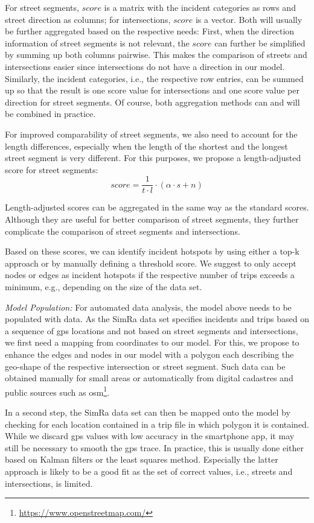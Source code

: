 For street segments, $score$ is a matrix with the incident categories as rows and street direction as columns; for intersections, $score$ is a vector.
Both will usually be further aggregated based on the respective needs:
First, when the direction information of street segments is not relevant, the $score$ can further be simplified by summing up both columns pairwise.
This makes the comparison of streets and intersections easier since intersections do not have a direction in our model.
Similarly, the incident categories, i.e., the respective row entries, can be summed up so that the result is one score value for intersections and one score value per direction for street segments.
Of course, both aggregation methods can and will be combined in practice.

For improved comparability of street segments, we also need to account for the length differences, especially when the length of the shortest and the longest street segment is very different.
For this purposes, we propose a length-adjusted score for street segments:
\begin{equation} \label{eq:score2} score = \frac{1}{t\cdot l} \cdot (\alpha \cdot s + n)\end{equation}

Length-adjusted scores can be aggregated in the same way as the standard scores.
Although they are useful for better comparison of street segments, they further complicate the comparison of street segments and intersections.

Based on these scores, we can identify incident hotspots by using either a top-k approach or by manually defining a threshold score.
We suggest to only accept nodes or edges as incident hotspots if the respective number of trips exceeds a minimum, e.g., depending on the size of the data set.

\textit{Model Population:}
For automated data analysis, the model above needs to be populated with data.
As the SimRa data set specifies incidents and trips based on a sequence of \ac{gps} locations and not based on street segments and intersections, we first need a mapping from coordinates to our model.
For this, we propose to enhance the edges and nodes in our model with a polygon each describing the geo-shape of the respective intersection or street segment.
Such data can be obtained manually for small areas or automatically from digital cadastres and public sources such as \ac{osm}\footnote{\url{https://www.openstreetmap.com/}}.

In a second step, the SimRa data set can then be mapped onto the model by checking for each location contained in a trip file in which polygon it is contained.
While we discard \ac{gps} values with low accuracy in the smartphone app, it may still be necessary to smooth the \ac{gps} trace.
In practice, this is usually done either based on Kalman filters or the least squares method.
Especially the latter approach is likely to be a good fit as the set of correct values, i.e., streets and intersections, is limited.

